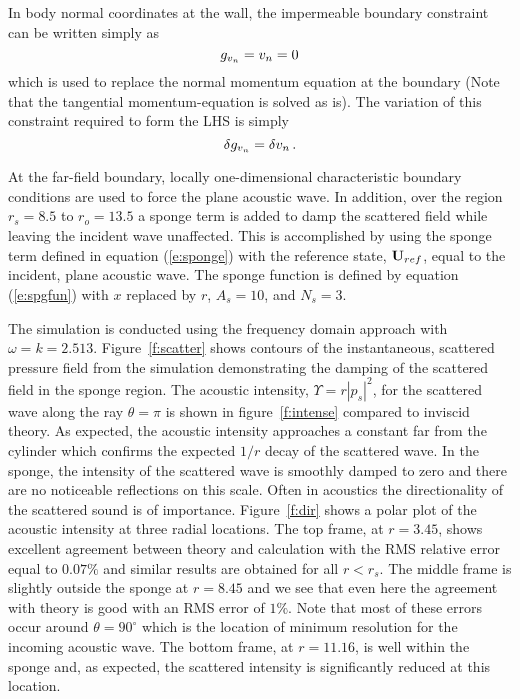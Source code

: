 In body normal coordinates at the wall, the impermeable boundary constraint
can be written simply as
%
\begin{equation}
  g_{{v_n}} = {v_n} = 0
\end{equation}
%
which is used to replace the normal momentum equation at the boundary (Note
that the tangential momentum-equation is solved as is).  The variation of this
constraint required to form the LHS is simply
%
\begin{equation}
  \delta g_{{v_n}} = \delta {v_n} {\, .}
\end{equation}

At the far-field boundary, locally one-dimensional characteristic boundary
conditions \cite{Giles:90} are used to force the plane acoustic wave. In
addition, over the region $r_s=8.5$ to $r_o=13.5$ a sponge term is added to
damp the scattered field while leaving the incident wave unaffected.  This is
accomplished by using the sponge term defined in equation (\ref{e:sponge})
with the reference state, ${\bf U}_{ref}$, equal to the incident, plane acoustic
wave.  The sponge function is defined by equation (\ref{e:spgfun}) with $x$
replaced by $r$, $A_s = 10$, and $N_s = 3$.

The simulation is conducted using the frequency domain approach with $\omega =
k = 2.513$.  Figure~\ref{f:scatter} shows contours of the instantaneous,
scattered pressure field from the simulation demonstrating the damping of the
scattered field in the sponge region.  The acoustic intensity, $\Upsilon = r
|p_s|^2$, for the scattered wave along the ray $\theta=\pi$ is shown in
figure~\ref{f:intense} compared to inviscid theory.  As expected, the acoustic
intensity approaches a constant far from the cylinder which confirms the
expected $1/r$ decay of the scattered wave.  In the sponge, the intensity of
the scattered wave is smoothly damped to zero and there are no noticeable
reflections on this scale.  Often in acoustics the directionality of the
scattered sound is of importance.  Figure~\ref{f:dir} shows a polar plot of
the acoustic intensity at three radial locations.  The top frame, at $r=3.45$,
shows excellent agreement between theory and calculation with the RMS relative
error equal to $0.07\%$ and similar results are obtained for all $r < r_s$.
The middle frame is slightly outside the sponge at $r=8.45$ and we see that
even here the agreement with theory is good with an RMS error of $1\%$.  Note
that most of these errors occur around $\theta=90^\circ$ which is the location
of minimum resolution for the incoming acoustic wave.  The bottom frame, at
$r=11.16$, is well within the sponge and, as expected, the scattered intensity
is significantly reduced at this location.

